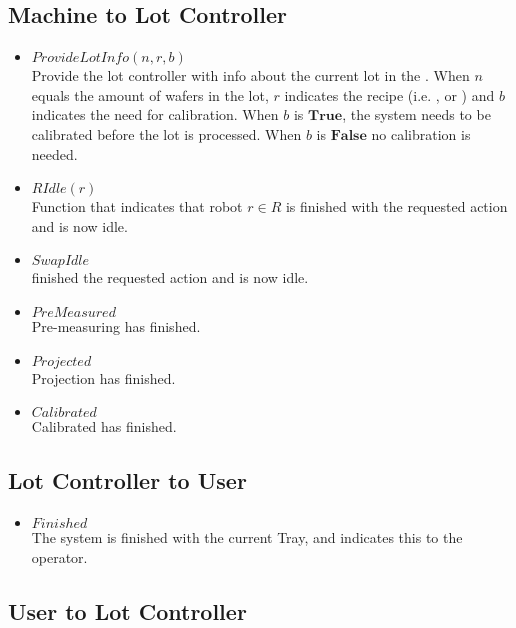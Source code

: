 \subsection{Machine to Lot Controller}
\begin{itemize}
    \item $\mathit{ProvideLotInfo}(n, r, b)$ \\
    Provide the lot controller with info about the current lot in the \tray.
    When $n$ equals the amount of wafers in the lot, $r$ indicates the recipe (i.e. \recipeOne, \recipeTwo or \recipeThree) and $b$ indicates the need for calibration.
    When $b$ is $\mathbf{True}$, the system needs to be calibrated before the lot is processed.
    When $b$ is $\mathbf{False}$ no calibration is needed.

    \item $\mathit{RIdle(r)}$ \\
    Function that indicates that robot $r \in R$ is finished with the requested action and is now idle.

    \item $SwapIdle$ \\
    \robotSwap finished the requested action and is now idle.

    \item $\mathit{PreMeasured}$ \\
    Pre-measuring has finished.

    \item $\mathit{Projected}$ \\
    Projection has finished.

    \item $\mathit{Calibrated}$ \\
    Calibrated has finished.

\end{itemize}

\subsection{Lot Controller to User}
\begin{itemize}
    \item $\mathit{Finished}$ \\
    The system is finished with the current Tray, and indicates this to the operator.
\end{itemize}

\subsection{User to Lot Controller}
